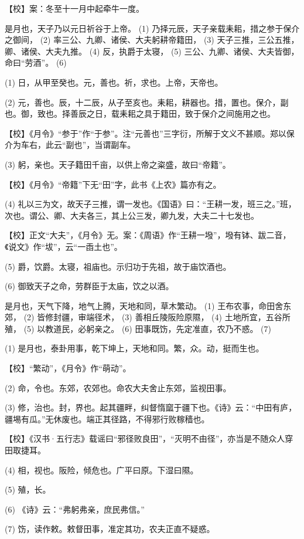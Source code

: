 \documentclass[12pt,UTF8]{ctexbook}
\begin{document}
【校】案：冬至十一月中起牵牛一度。

是月也，天子乃以元日祈谷于上帝。 (1) 乃择元辰，天子亲载耒耜，措之参于保介之御间， (2) 率三公、九卿、诸侯、大夫躬耕帝籍田， (3) 天子三推，三公五推，卿、诸侯、大夫九推。 (4) 反，执爵于太寝， (5) 三公、九卿、诸侯、大夫皆御，命曰“劳酒”。 (6)

(1) 日，从甲至癸也。元，善也。祈，求也。上帝，天帝也。

(2) 元，善也。辰，十二辰，从子至亥也。耒耜，耕器也。措，置也。保介，副也。御，致也。择善辰之日，载耒耜之具于籍田，致于保介之间施用之也。

【校】《月令》“参于”作“于参”。注“元善也”三字衍，所解于文义不甚顺。郑以保介为车右，此云“副也”，当谓副车。

(3) 躬，亲也。天子籍田千亩，以供上帝之粢盛，故曰“帝籍”。

【校】《月令》“帝籍”下无“田”字，此书《上农》篇亦有之。

(4) 礼以三为文，故天子三推，谓一发也。《国语》曰：“王耕一发，班三之。”班，次也。谓公、卿、大夫各三，其上公三发，卿九发，大夫二十七发也。

【校】正文“大夫”，《月令》无。案：《周语》作“王耕一墢”，墢有钵、跋二音，《说文》作“坺”，云“一臿土也”。

(5) 爵，饮爵。太寝，祖庙也。示归功于先祖，故于庙饮酒也。

(6) 御致天子之命，劳群臣于太庙，饮之以酒。

是月也，天气下降，地气上腾，天地和同，草木繁动。 (1) 王布农事，命田舍东郊， (2) 皆修封疆，审端径术， (3) 善相丘陵阪险原隰， (4) 土地所宜，五谷所殖， (5) 以教道民，必躬亲之。 (6) 田事既饬，先定准直，农乃不惑。 (7)

(1) 是月也，泰卦用事，乾下坤上，天地和同。繁，众。动，挺而生也。

【校】“繁动”，《月令》作“萌动”。

(2) 命，令也。东郊，农郊也。命农大夫舍止东郊，监视田事。

(3) 修，治也。封，界也。起其疆畔，纠督惰窳于疆下也。《诗》云：“中田有庐，疆埸有瓜。”无休废也。端正其径路，不得邪行败稼穑也。

【校】《汉书·五行志》载谣曰“邪径败良田”，“灭明不由径”，亦当是不随众人穿田取捷耳。

(4) 相，视也。阪险，倾危也。广平曰原。下湿曰隰。

(5) 殖，长。

(6) 《诗》云：“弗躬弗亲，庶民弗信。”

(7) 饬，读作敕。敕督田事，准定其功，农夫正直不疑惑。
\end{document}
